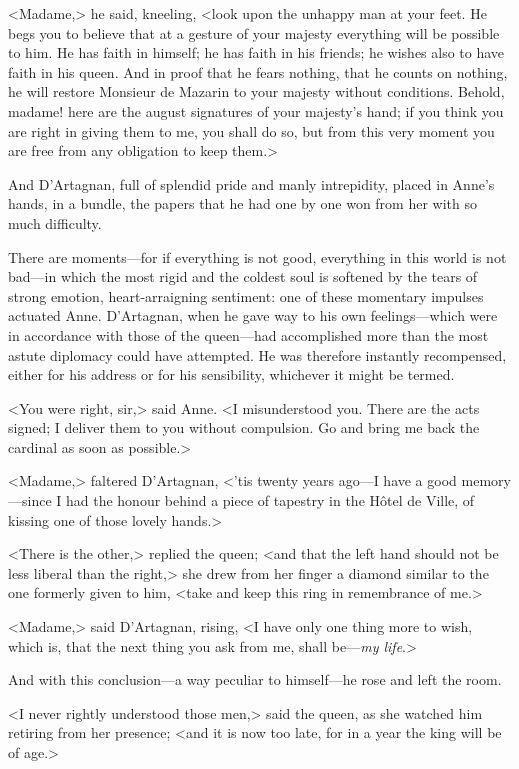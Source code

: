 <Madame,> he said, kneeling, <look upon the unhappy man at your feet. He begs you to believe that at a gesture of your majesty everything will be possible to him. He has faith in himself; he has faith in his friends; he wishes also to have faith in his queen. And in proof that he fears nothing, that he counts on nothing, he will restore Monsieur de Mazarin to your majesty without conditions. Behold, madame! here are the august signatures of your majesty's hand; if you think you are right in giving them to me, you shall do so, but from this very moment you are free from any obligation to keep them.>

And D'Artagnan, full of splendid pride and manly intrepidity, placed in Anne's hands, in a bundle, the papers that he had one by one won from her with so much difficulty.

There are moments—for if everything is not good, everything in this world is not bad—in which the most rigid and the coldest soul is softened by the tears of strong emotion, heart-arraigning sentiment: one of these momentary impulses actuated Anne. D'Artagnan, when he gave way to his own feelings—which were in accordance with those of the queen—had accomplished more than the most astute diplomacy could have attempted. He was therefore instantly recompensed, either for his address or for his sensibility, whichever it might be termed.

<You were right, sir,> said Anne. <I misunderstood you. There are the acts signed; I deliver them to you without compulsion. Go and bring me back the cardinal as soon as possible.>

<Madame,> faltered D'Artagnan, <'tis twenty years ago—I have a good memory—since I had the honour behind a piece of tapestry in the Hôtel de Ville, of kissing one of those lovely hands.>

<There is the other,> replied the queen; <and that the left hand should not be less liberal than the right,> she drew from her finger a diamond similar to the one formerly given to him, <take and keep this ring in remembrance of me.>

<Madame,> said D'Artagnan, rising, <I have only one thing more to wish, which is, that the next thing you ask from me, shall be—\emph{my life}.>

And with this conclusion—a way peculiar to himself—he rose and left the room.

<I never rightly understood those men,> said the queen, as she watched him retiring from her presence; <and it is now too late, for in a year the king will be of age.>


